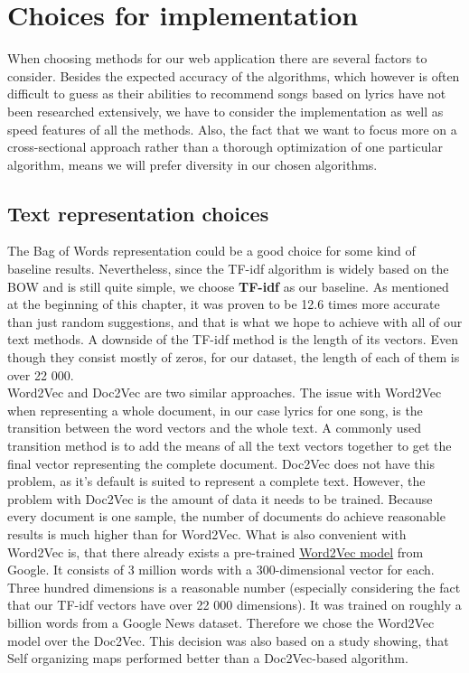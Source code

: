 \section{Choices for implementation}
When choosing methods for our web application there are several factors to consider. Besides the expected accuracy of the algorithms, which however is often difficult to guess as their abilities to recommend songs based on lyrics have not been researched extensively, we have to consider the implementation as well as speed  features of all the methods. Also, the fact that we want to focus more on a cross-sectional approach rather than a thorough optimization of one particular algorithm, means we will prefer diversity in our chosen algorithms. 
\subsection{Text representation choices}
The Bag of Words representation could be a good choice for some kind of baseline results. Nevertheless, since the TF-idf algorithm is widely based on the BOW and is still quite simple, we choose \textbf{TF-idf} as our baseline. As mentioned at the beginning of this chapter, it was proven to be 12.6 times more accurate than just random suggestions, and that is what we hope to achieve with all of our text methods. A downside of the TF-idf method is the length of its vectors. Even though they consist mostly of zeros, for our dataset, the length of each of them is over 22 000. \\

Word2Vec and Doc2Vec are two similar approaches. The issue with Word2Vec when representing a whole document, in our case lyrics for one song, is the transition between the word vectors and the whole text. A commonly used transition method is to add the means of all the text vectors together to get the final vector representing the complete document. Doc2Vec does not have this problem, as it's default is suited to represent a complete text. However, the problem with Doc2Vec is the amount of data it needs to be trained. Because every document is one sample, the number of documents do achieve reasonable results is much higher than for Word2Vec. What is also convenient with Word2Vec is, that there already exists a pre-trained \underline{\color{blue}\href{https://code.google.com/archive/p/word2vec/}{Word2Vec model}} from Google. It consists of 3 million words with a 300-dimensional vector for each. Three hundred dimensions is a reasonable number (especially considering the fact that our TF-idf vectors have over 22 000 dimensions). It was trained on roughly a billion words from a Google News dataset. Therefore we chose the Word2Vec model over the Doc2Vec. This decision was also based on a study \cite{inproceedings} showing, that Self organizing maps performed better than a Doc2Vec-based algorithm. \\

